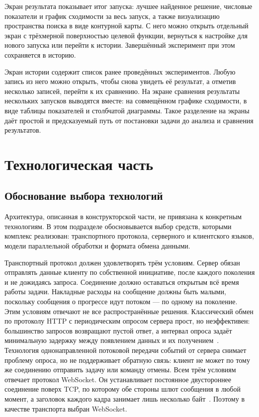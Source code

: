 \documentclass[14pt, a4paper]{extarticle}
\begin{document}
Экран результата показывает итог запуска: лучшее найденное решение, числовые
показатели и график сходимости за весь запуск, а также визуализацию пространства
поиска в виде контурной карты. С него можно открыть отдельный экран с трёхмерной
поверхностью целевой функции, вернуться к настройке для нового запуска или
перейти к истории. Завершённый эксперимент при этом сохраняется в историю.

Экран истории содержит список ранее проведённых экспериментов. Любую запись из
него можно открыть, чтобы снова увидеть её результат, а отметив несколько записей,
перейти к их сравнению. На экране сравнения результаты нескольких запусков
выводятся вместе: на совмещённом графике сходимости, в виде таблицы показателей и
столбчатой диаграммы. Такое разделение на экраны даёт простой и предсказуемый путь
от постановки задачи до анализа и сравнения результатов.

\section{Технологическая часть}\label{sec:technology}

\subsection{Обоснование выбора технологий}
\label{subsec:stack}

Архитектура, описанная в конструкторской части, не привязана к конкретным
технологиям. В этом подразделе обосновывается выбор средств, которыми
комплекс реализован: транспортного протокола, серверного и клиентского
языков, модели параллельной обработки и формата обмена данными.

Транспортный протокол должен удовлетворять трём условиям. Сервер обязан
отправлять данные клиенту по собственной инициативе, после каждого поколения и
не дожидаясь запроса. Соединение должно оставаться открытым всё время работы
задачи. Накладные расходы на сообщение должны быть малыми, поскольку сообщения о
прогрессе идут потоком --- по одному на поколение. Этим условиям отвечают не все
распространённые решения. Классический обмен по протоколу HTTP с периодическим
опросом сервера прост, но неэффективен: большинство запросов возвращают пустой
ответ, а интервал опроса задаёт минимальную задержку между появлением данных и их
получением~\cite{olifer2016}. Технология однонаправленной потоковой передачи
событий от сервера снимает проблему опроса, но не поддерживает обратную связь:
клиент не может по тому же соединению отправить задачу или команду отмены. Всем
трём условиям отвечает протокол WebSocket. Он устанавливает постоянное
двустороннее соединение поверх TCP, по которому обе стороны шлют сообщения в любой
момент, а заголовок каждого кадра занимает лишь несколько байт~\cite{fedulov2025}.
Поэтому в качестве транспорта выбран WebSocket.
\end{document}
